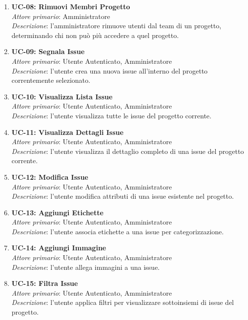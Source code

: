 \begin{enumerate}[leftmargin=1.1em]
\item \textbf{UC-08: Rimuovi Membri Progetto} \\
\textit{Attore primario}: Amministratore \\
\textit{Descrizione}: l'amministratore rimuove utenti dal team di un progetto, determinando chi non può più accedere a quel progetto.

\item \textbf{UC-09: Segnala Issue} \\
\textit{Attore primario}: Utente Autenticato, Amministratore \\
\textit{Descrizione}: l'utente crea una nuova issue all'interno del progetto correntemente selezionato.

\item \textbf{UC-10: Visualizza Lista Issue} \\
\textit{Attore primario}: Utente Autenticato, Amministratore \\
\textit{Descrizione}: l'utente visualizza tutte le issue del progetto corrente.

\item \textbf{UC-11: Visualizza Dettagli Issue} \\
\textit{Attore primario}: Utente Autenticato, Amministratore \\
\textit{Descrizione}: l'utente visualizza il dettaglio completo di una issue del progetto corrente.

\item \textbf{UC-12: Modifica Issue} \\
\textit{Attore primario}: Utente Autenticato, Amministratore \\
\textit{Descrizione}: l'utente modifica attributi di una issue esistente nel progetto.

\item \textbf{UC-13: Aggiungi Etichette} \\
\textit{Attore primario}: Utente Autenticato, Amministratore \\
\textit{Descrizione}: l'utente associa etichette a una issue per categorizzazione.

\item \textbf{UC-14: Aggiungi Immagine} \\
\textit{Attore primario}: Utente Autenticato, Amministratore \\
\textit{Descrizione}: l'utente allega immagini a una issue.

\item \textbf{UC-15: Filtra Issue} \\
\textit{Attore primario}: Utente Autenticato, Amministratore \\
\textit{Descrizione}: l'utente applica filtri per visualizzare sottoinsiemi di issue del progetto.


\end{enumerate}
